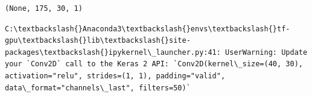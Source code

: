 \documentclass[11pt]{article}
\begin{document}
    \begin{Verbatim}[commandchars=\\\{\}]
(None, 175, 30, 1)

    \end{Verbatim}

    \begin{Verbatim}[commandchars=\\\{\}]
C:\textbackslash{}Anaconda3\textbackslash{}envs\textbackslash{}tf-gpu\textbackslash{}lib\textbackslash{}site-packages\textbackslash{}ipykernel\_launcher.py:41: UserWarning: Update your `Conv2D` call to the Keras 2 API: `Conv2D(kernel\_size=(40, 30), activation="relu", strides=(1, 1), padding="valid", data\_format="channels\_last", filters=50)`

    \end{Verbatim}
\end{document}
